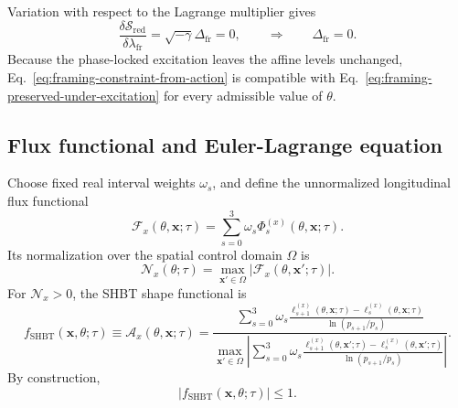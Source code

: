Variation with respect to the Lagrange multiplier gives
\begin{equation}
  \frac{\delta\mathcal S_{\mathrm{red}}}
  {\delta\lambda_{\mathrm{fr}}}
  =
  \sqrt{-\gamma}
  \Delta_{\mathrm{fr}}
  =
  0,
  \qquad
  \Longrightarrow
  \qquad
  \Delta_{\mathrm{fr}}=0.
  \label{eq:framing-constraint-from-action}
\end{equation}
Because the phase-locked excitation leaves the affine levels unchanged, Eq.~\eqref{eq:framing-constraint-from-action} is compatible with Eq.~\eqref{eq:framing-preserved-under-excitation} for every admissible value of \(\theta\).

\subsection{Flux functional and Euler-Lagrange equation}

Choose fixed real interval weights \(\omega_s\), and define the unnormalized longitudinal flux functional
\begin{equation}
  \mathcal F_x(\theta,\boldsymbol{x};\tau)
  =
  \sum_{s=0}^{3}
  \omega_s
  \Phi_s^{(x)}(\theta,\boldsymbol{x};\tau).
  \label{eq:unnormalized-longitudinal-flux}
\end{equation}
Its normalization over the spatial control domain \(\Omega\) is
\begin{equation}
  \mathcal N_x(\theta;\tau)
  =
  \max_{\boldsymbol{x}'\in\Omega}
  \left|
    \mathcal F_x(\theta,\boldsymbol{x}';\tau)
  \right|.
  \label{eq:longitudinal-flux-normalization}
\end{equation}
For \(\mathcal N_x>0\), the SHBT shape functional is
\begin{equation}
  f_{\mathrm{SHBT}}(\boldsymbol{x},\theta;\tau)
  \equiv
  \mathcal A_x(\theta,\boldsymbol{x};\tau)
  =
  \frac{
    \displaystyle
    \sum_{s=0}^{3}
    \omega_s
    \frac{
      \ell_{s+1}^{(x)}(\theta,\boldsymbol{x};\tau)
      -
      \ell_s^{(x)}(\theta,\boldsymbol{x};\tau)
    }{
      \ln(p_{s+1}/p_s)
    }
  }{
    \displaystyle
    \max_{\boldsymbol{x}'\in\Omega}
    \left|
      \sum_{s=0}^{3}
      \omega_s
      \frac{
        \ell_{s+1}^{(x)}(\theta,\boldsymbol{x}';\tau)
        -
        \ell_s^{(x)}(\theta,\boldsymbol{x}';\tau)
      }{
        \ln(p_{s+1}/p_s)
      }
    \right|
  }.
  \label{eq:shbt-shape-functional}
\end{equation}
By construction,
\begin{equation}
  \left|
    f_{\mathrm{SHBT}}(\boldsymbol{x},\theta;\tau)
  \right|
  \leq1.
  \label{eq:shape-functional-bound}
\end{equation}

